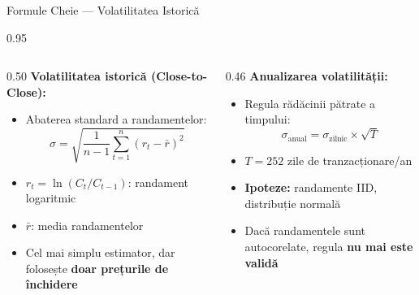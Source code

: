 \documentclass[9pt, aspectratio=169, t]{beamer}
\begin{document}
\begin{frame}[shrink=10]{Formule Cheie --- Volatilitatea Istorică}
    \begin{cminipage}{0.95\textwidth}
    \begin{columns}[T]
        \begin{column}{0.50\textwidth}
            \textbf{Volatilitatea istorică (Close-to-Close):}
            \begin{itemize}\setlength{\itemsep}{0pt}
                \item Abaterea standard a randamentelor:
                \[
                \sigma = \sqrt{\frac{1}{n-1}\sum_{t=1}^{n}(r_t - \bar{r})^2}
                \]
                \item $r_t = \ln(C_t / C_{t-1})$: randament logaritmic
                \item $\bar{r}$: media randamentelor
                \item Cel mai simplu estimator, dar folosește \textbf{doar prețurile de închidere}
            \end{itemize}
        \end{column}
        \begin{column}{0.46\textwidth}
            \textbf{Anualizarea volatilității:}
            \begin{itemize}\setlength{\itemsep}{0pt}
                \item Regula rădăcinii pătrate a timpului:
                \[
                \sigma_{\text{anual}} = \sigma_{\text{zilnic}} \times \sqrt{T}
                \]
                \item $T = 252$ zile de tranzacționare/an
                \item \textbf{Ipoteze:} randamente IID, distribuție normală
                \item Dacă randamentele sunt autocorelate, regula \textbf{nu mai este validă}
            \end{itemize}
        \end{column}
    \end{columns}
    \end{cminipage}
\end{frame}
\end{document}
